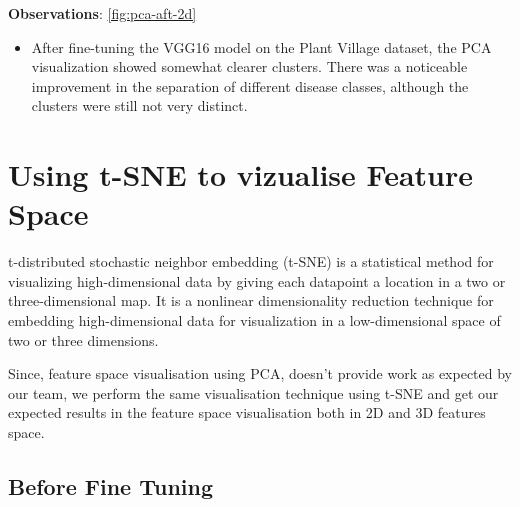 \textbf{Observations}: \ref{fig:pca-aft-2d}
\begin{itemize}
    \item After fine-tuning the VGG16 model on the Plant Village dataset, the PCA visualization showed somewhat clearer clusters. There was a noticeable improvement in the separation of different disease classes, although the clusters were still not very distinct.
\end{itemize}

\FloatBarrier

\section{Using t-SNE to vizualise Feature Space}
t-distributed stochastic neighbor embedding (t-SNE) is a statistical method for visualizing high-dimensional data by giving each datapoint a location in a two or three-dimensional map.
It is a nonlinear dimensionality reduction technique for embedding high-dimensional data for visualization in a low-dimensional space of two or three dimensions\cite{tsne-0}\cite{tsne-1}\cite{tsne-2}.\par\vspace{1em}

Since, feature space visualisation using PCA, doesn't provide work as expected by our team, we perform the same visualisation technique using t-SNE and get our expected results in the feature space visualisation both in 2D and 3D features space.

\subsection{Before Fine Tuning}

